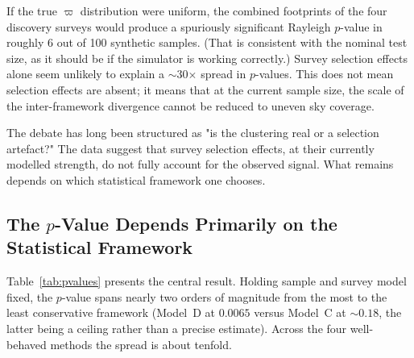 \documentclass[usenatbib]{mnras}
\begin{document}
If the true $\varpi$ distribution were uniform, the combined footprints of the four discovery surveys would produce a spuriously significant Rayleigh $p$-value in roughly 6 out of 100 synthetic samples. (That is consistent with the nominal test size, as it should be if the simulator is working correctly.) Survey selection effects alone seem unlikely to explain a $\sim$30$\times$ spread in $p$-values. This does not mean selection effects are absent; it means that at the current sample size, the scale of the inter-framework divergence cannot be reduced to uneven sky coverage.

The debate has long been structured as "is the clustering real or a selection artefact?" The data suggest that survey selection effects, at their currently modelled strength, do not fully account for the observed signal. What remains depends on which statistical framework one chooses.

\subsection{The $p$-Value Depends Primarily on the Statistical Framework}

Table~\ref{tab:pvalues} presents the central result. Holding sample and survey model fixed, the $p$-value spans nearly two orders of magnitude from the most to the least conservative framework (Model~D at $0.0065$ versus Model~C at $\sim0.18$, the latter being a ceiling rather than a precise estimate). Across the four well-behaved methods the spread is about tenfold.
\end{document}
